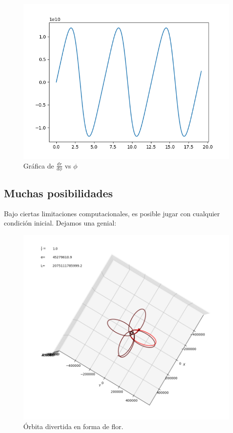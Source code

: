\begin{figure}[h!]
    \centering
    \includegraphics[width=.8\textwidth]{Im/drvsphi_mercurio.png}
    \caption{Gráfica de $\frac{dr}{d\phi}$ vs $\phi$}
\end{figure}

\subsection*{Muchas posibilidades}
Bajo ciertas limitaciones computacionales, es posible jugar con cualquier condición inicial. Dejamos una genial:

\begin{figure}[h!]
    \centering
    \includegraphics[width=.8\textwidth]{Im/Roseta.png}
    \caption{Órbita divertida en forma de flor.}
\end{figure}
\newpage



